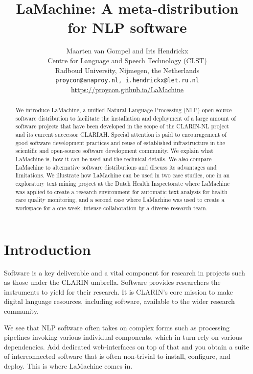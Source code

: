 \documentclass[a4paper,11pt]{article}
\title{LaMachine: A meta-distribution for NLP software}
\author{Maarten van Gompel  and Iris Hendrickx\\
  Centre for Language and Speech Technology (CLST) \\
  Radboud University, Nijmegen, the Netherlands \\
  {\tt proycon@anaproy.nl, i.hendrickx@let.ru.nl} \\ %
  \url{https://proycon.github.io/LaMachine}
}
\date{}
\begin{document}
\maketitle

\begin{abstract}
We introduce LaMachine, a unified Natural Language Processing (NLP) open-source software distribution to facilitate the
installation and deployment of a large amount of software projects that have been developed in the scope of the
CLARIN-NL project and its current successor CLARIAH. Special attention is paid to encouragement of good software
development practices and reuse of established infrastructure in the scientific and open-source software development
community. We explain what LaMachine is, how it can be used and the technical details. We also compare LaMachine to alternative software distributions and discuss its advantages and limitations. We illustrate how LaMachine can be used in two case studies, one in an exploratory text mining project at the Dutch Health Inspectorate where LaMachine was applied to create a research environment for automatic text analysis for health care quality monitoring, and a second case where LaMachine was used to create a workspace for a one-week, intense collaboration by a diverse research team.
\end{abstract}

\section{Introduction}
\label{sec:intro}

Software is a key deliverable and a vital component for research in projects such as those under the CLARIN umbrella. Software provides researchers the instruments to yield for their research. It is CLARIN's core mission to make
digital language resources, including software, available to the wider research community.

We see that NLP software often takes on complex forms such as processing pipelines invoking various individual
components, which in turn rely on various dependencies. Add dedicated web-interfaces on top of that and you obtain a
suite of interconnected software that is often non-trivial to install, configure, and deploy. This is where LaMachine
comes in.
\end{document}
